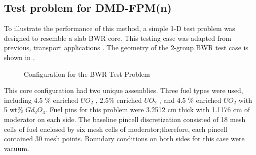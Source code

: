 \subsection{Test problem for DMD-FPM(n)}

To illustrate the performance of this method, a simple 1-D test problem was designed to resemble a slab BWR core.
This testing case was adapted from previous, transport applications \citep{rahnema_generalized_2008}. 
The geometry of the 2-group BWR test case is shown in .
\begin{figure}[htb!]
    \centering
    \begin{minipage}[c]{\textwidth}
        \centering
        
    \end{minipage}
    \begin{minipage}[c]{\textwidth}
        \centering
        
    \end{minipage}
    \begin{minipage}[c]{\textwidth}
        \centering
        
    \end{minipage}
    \caption{Configuration for the BWR Test Problem\cite{rahnema_generalized_2008}}
    \label{fig:BWRconfig}
\end{figure}

This core configuration had two unique assemblies.  
Three fuel types were used, including  4.5 \% enriched $UO_2$ , 2.5\% enriched $UO_2$ , and 4.5 \% enriched $UO_2$ with 5 wt\% $Gd_2O_3$.
Fuel pins for this problem were 3.2512 cm thick with 1.1176 cm of moderator on each side.
The baseline pincell discretization consisted of 18 mesh cells of fuel enclosed by six mesh cells of moderator;therefore, each pincell contained 30 mesh points.
Boundary conditions on both sides for this case were vacuum.

